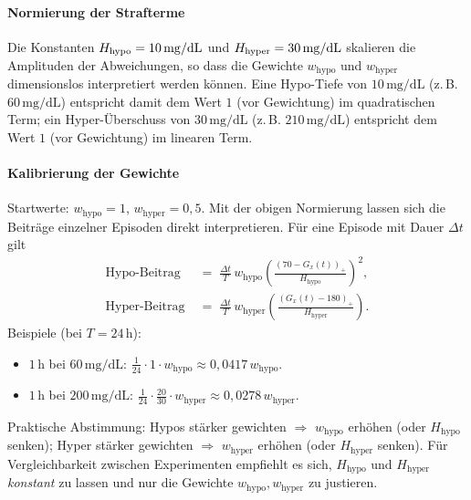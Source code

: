 \paragraph{Normierung der Strafterme}

Die Konstanten $H_{\text{hypo}}=10\,\mathrm{mg/dL}$ und $H_{\text{hyper}}=30\,\mathrm{mg/dL}$ skalieren die Amplituden der Abweichungen, so dass die Gewichte $w_{\mathrm{hypo}}$ und $w_{\mathrm{hyper}}$ dimensionslos interpretiert werden können. Eine Hypo-Tiefe von $10\,\mathrm{mg/dL}$ (z.\,B. $60\,\mathrm{mg/dL}$) entspricht damit dem Wert $1$ (vor Gewichtung) im quadratischen Term; ein Hyper-Überschuss von $30\,\mathrm{mg/dL}$ (z.\,B. $210\,\mathrm{mg/dL}$) entspricht dem Wert $1$ (vor Gewichtung) im linearen Term.

\paragraph{Kalibrierung der Gewichte}
Startwerte: \(w_{\mathrm{hypo}}=1\), \(w_{\mathrm{hyper}}=0{,}5\). Mit der obigen Normierung lassen sich die Beiträge einzelner Episoden direkt interpretieren. Für eine Episode mit Dauer \(\Delta t\) gilt
\[
\begin{aligned}
\text{Hypo-Beitrag} \; &=\; \frac{\Delta t}{T}\, w_{\mathrm{hypo}} \left( \frac{(70-G_x(t))_+}{H_{\text{hypo}}} \right)^{\!2},\\
\text{Hyper-Beitrag} \; &=\; \frac{\Delta t}{T}\, w_{\mathrm{hyper}} \left( \frac{(G_x(t)-180)_+}{H_{\text{hyper}}} \right).
\end{aligned}
\]
Beispiele (bei \(T=24\,\mathrm{h}\)):
\begin{itemize}
  \item \(1\,\mathrm{h}\) bei \(60\,\mathrm{mg/dL}\): \(\tfrac{1}{24}\cdot 1 \cdot w_{\mathrm{hypo}} \approx 0{,}0417\,w_{\mathrm{hypo}}\).
  \item \(1\,\mathrm{h}\) bei \(200\,\mathrm{mg/dL}\): \(\tfrac{1}{24}\cdot \tfrac{20}{30}\cdot w_{\mathrm{hyper}} \approx 0{,}0278\,w_{\mathrm{hyper}}\).
\end{itemize}
Praktische Abstimmung: Hypos stärker gewichten \(\Rightarrow\) \(w_{\mathrm{hypo}}\) erhöhen (oder \(H_{\text{hypo}}\) senken); Hyper stärker gewichten \(\Rightarrow\) \(w_{\mathrm{hyper}}\) erhöhen (oder \(H_{\text{hyper}}\) senken). Für Vergleichbarkeit zwischen Experimenten empfiehlt es sich, \(H_{\text{hypo}}\) und \(H_{\text{hyper}}\) \emph{konstant} zu lassen und nur die Gewichte \(w_{\mathrm{hypo}}, w_{\mathrm{hyper}}\) zu justieren.
\vspace{1em}
